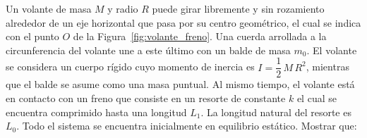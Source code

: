 \documentclass[addpoints]{exam}
\newcommand{\ver}[1]{\hat{\mathbf{#1}}}
\begin{document}
\begin{questions}

    \pagebreak

    \question \label{ej:volante_freno} Un volante de masa $M$ y radio $R$ puede girar libremente y sin rozamiento alrededor de un eje horizontal que pasa por su centro geométrico, el cual se indica con el punto $O$ de la Figura~\ref{fig:volante_freno}. Una cuerda arrollada a la circunferencia del volante une a este último con un balde de masa $m_0$. El volante se considera un cuerpo rígido cuyo momento de inercia es $I = \dfrac{1}{2} \, M \, R^2$, mientras que el balde se asume como una masa puntual. Al mismo tiempo, el volante está en contacto con un freno que consiste en un resorte de constante $k$ el cual se encuentra comprimido hasta una longitud $L_1$. La longitud natural del resorte es $L_0$. Todo el sistema se encuentra inicialmente en equilibrio estático. Mostrar que:

    \begin{figure}[ht]
        \centering
\end{figure}
\end{questions}
\end{document}

